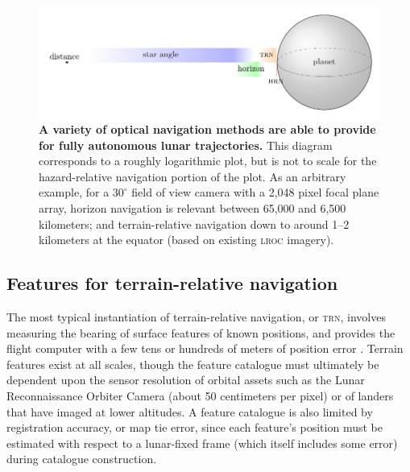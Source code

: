 \documentclass[12pt]{olfmemo}
\begin{document}
\begin{figure}
\includegraphics[width=\textwidth]{opnavmethods.pdf}
\caption{\label{fig:opnavmethods}\textbf{A variety of optical navigation methods are able to provide for fully autonomous lunar trajectories.} This diagram corresponds to a roughly logarithmic plot, but is not to scale for the hazard-relative navigation portion of the plot. As an arbitrary example, for a $30^\circ$ field of view camera with a 2,048 pixel focal plane array, horizon navigation is relevant between 65,000 and 6,500 kilometers; and terrain-relative navigation down to around 1--2 kilometers at the equator (based on existing \textsc{lroc} imagery).}
\end{figure}


\subsection{Features for terrain-relative navigation}
The most typical instantiation of terrain-relative navigation, or \textsc{trn}, involves measuring the bearing of surface features of known positions, and provides the flight computer with a few tens or hundreds of meters of position error \citep{Christensen2011}. Terrain features exist at all scales, though the feature catalogue must ultimately be dependent upon the sensor resolution of orbital assets such as the Lunar Reconnaissance Orbiter Camera (about 50 centimeters per pixel) or of landers that have imaged at lower altitudes. A feature catalogue is also limited by registration accuracy, or map tie error, since each feature's position must be estimated with respect to a lunar-fixed frame (which itself includes some error) during catalogue construction.
\end{document}
